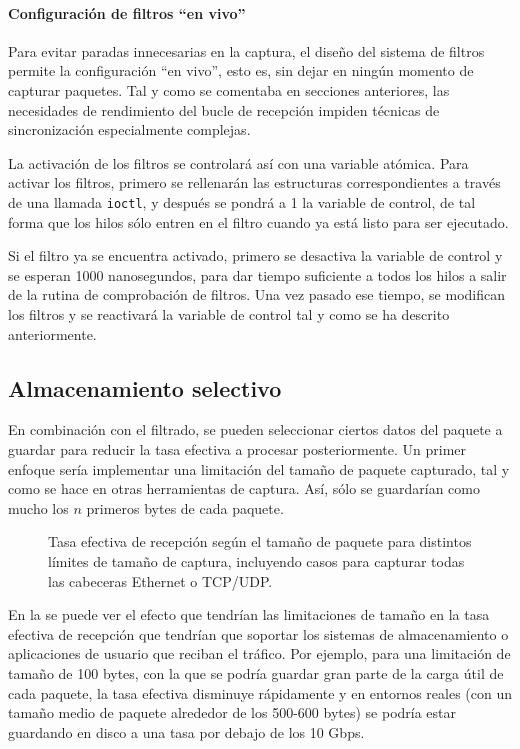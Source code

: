 \documentclass[twoside, 12pt, draft]{epstfg}
\begin{document}
\paragraph{Configuración de filtros ``en vivo''}

Para evitar paradas innecesarias en la captura, el diseño del sistema de filtros permite la configuración ``en vivo'', esto es, sin dejar en ningún momento de capturar paquetes. Tal y como se comentaba en secciones anteriores, las necesidades de rendimiento del bucle de recepción impiden técnicas de sincronización especialmente complejas.

La activación de los filtros se controlará así con una variable atómica. Para activar los filtros, primero se rellenarán las estructuras correspondientes a través de una llamada \texttt{ioctl}, y después se pondrá a 1 la variable de control, de tal forma que los hilos sólo entren en el filtro cuando ya está listo para ser ejecutado.

Si el filtro ya se encuentra activado, primero se desactiva la variable de control y se esperan 1000 nanosegundos, para dar tiempo suficiente a todos los hilos a salir de la rutina de comprobación de filtros. Una vez pasado ese tiempo, se modifican los filtros y se reactivará la variable de control tal y como se ha descrito anteriormente.

\subsection{Almacenamiento selectivo}

En combinación con el filtrado, se pueden seleccionar ciertos datos del paquete a guardar para reducir la tasa efectiva a procesar posteriormente. Un primer enfoque sería implementar una limitación del tamaño de paquete capturado, tal y como se hace en otras herramientas de captura. Así, sólo se guardarían como mucho los $n$ primeros bytes de cada paquete.

\begin{figure}[btp]
\caption[Tasa efectiva limitando el tamaño de paquete]{Tasa efectiva de recepción según el tamaño de paquete para distintos límites de tamaño de captura, incluyendo casos para capturar todas las cabeceras Ethernet o TCP/UDP.}
\label{fig:Desarrollo:CaplenEffects}
\end{figure}

En la  se puede ver el efecto que tendrían las limitaciones de tamaño en la tasa efectiva de recepción que tendrían que soportar los sistemas de almacenamiento o aplicaciones de usuario que reciban el tráfico. Por ejemplo, para una limitación de tamaño de 100 bytes, con la que se podría guardar gran parte de la carga útil de cada paquete, la tasa efectiva disminuye rápidamente y en entornos reales (con un tamaño medio de paquete alrededor de los 500-600 bytes) se podría estar guardando en disco a una tasa por debajo de los 10 Gbps.
\end{document}
